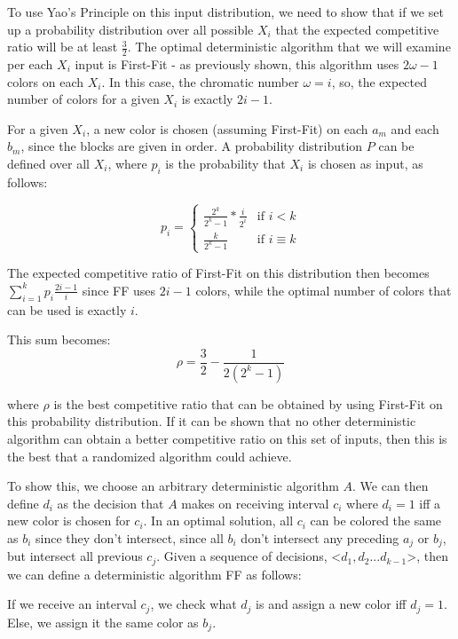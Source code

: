 To use Yao's Principle on this input distribution, we need to show that if we set up a probability distribution over all possible $X_i$ that the expected competitive ratio will be at least $\frac{3}{2}$. The optimal deterministic algorithm that we will examine per each $X_i$ input is First-Fit - as previously shown, this algorithm uses $2\omega-1$ colors on each $X_i$. In this case, the chromatic number $\omega=i$, so, the expected number of colors for a given $X_i$ is exactly $2i-1$.

For a given $X_i$, a new color is chosen (assuming First-Fit) on each $a_m$ and each $b_m$, since the blocks are given in order. A probability distribution $P$ can be defined over all $X_i$, where $p_i$ is the probability that $X_i$ is chosen as input, as follows:

\[p_i = \begin{cases} \frac{2^k}{2^k-1}*\frac{i}{2^i} &\mbox{if } i < k \\
\frac{k}{2^k-1} & \mbox{if } i \equiv k 
 \end{cases}\]

The expected competitive ratio of First-Fit on this distribution then becomes $\sum_{i=1}^k p_i\frac{2i-1}{i}$ since FF uses $2i-1$ colors, while the optimal number of colors that can be used is exactly $i$.

This sum becomes:
\begin{equation*}
\rho = \frac{3}{2} - \frac{1}{2(2^k-1)}
\end{equation*}

where $\rho$ is the best competitive ratio that can be obtained by using First-Fit on this probability distribution. If it can be shown that no other deterministic algorithm can obtain a better competitive ratio on this set of inputs, then this is the best that a randomized algorithm could achieve.

To show this, we choose an arbitrary deterministic algorithm $A$. We can then define $d_i$ as the decision that $A$ makes on receiving interval $c_i$ where $d_i = 1$ iff a new color is chosen for $c_i$.  In an optimal solution, all $c_i$ can be colored the same as $b_i$ since they don't intersect, since all $b_i$ don't intersect any preceding $a_j$ or $b_j$, but intersect all previous $c_j$.  Given a sequence of decisions, <$d_1, d_2...d_{k-1}$>, then we can define a deterministic algorithm FF as follows:

If we receive an interval $c_j$, we check what $d_j$ is and assign a new color iff $d_j = 1$. Else, we assign it the same color as $b_j$. 


